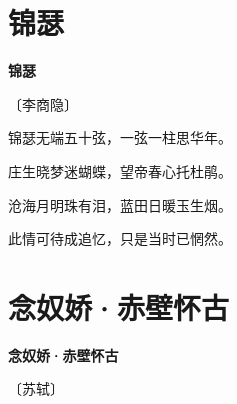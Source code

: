 \documentclass[12pt,UTF-8,openany,fontset=none]{ctexbook}
\begin{document}
\vspace{8pt}
\clearpage

\section{锦瑟}


\begin{center}
    {\bfseries 锦瑟}

    \vspace{18pt}

    \begin{large}\xuwen
        〔李商隐〕
    \end{large}

\end{center}

    \vspace{18pt}  %

\begin{center}
    \begin{Large}

        锦瑟无端五十弦，一弦一柱思华年。

        庄生晓梦迷蝴蝶，望帝春心托杜鹃。

        沧海月明珠有泪，蓝田日暖玉生烟。

        此情可待成追忆，只是当时已惘然。

    \end{Large}

\end{center}

\vspace{8pt}
\clearpage

\section{念奴娇·赤壁怀古}


\begin{center}
    {\bfseries 念奴娇·赤壁怀古}

    \vspace{18pt}

    \begin{large}\xuwen
        〔苏轼〕
    \end{large}

\end{center}

    \vspace{18pt}  %
\end{document}
